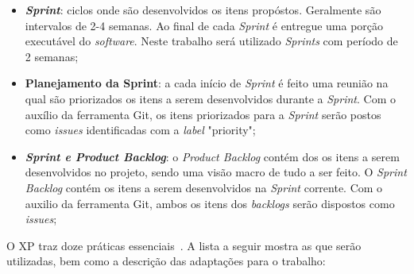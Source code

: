 \begin{itemize}
  \item \textit{\textbf{Sprint}}: ciclos onde são desenvolvidos os itens propóstos. Geralmente
    são intervalos de 2-4 semanas. Ao final de cada \textit{Sprint} é entregue uma porção 
    executável do \textit{software}. Neste trabalho será utilizado \textit{Sprints} com período
    de 2 semanas;
  \item \textbf{Planejamento da Sprint}: a cada início de \textit{Sprint} é feito uma reunião
    na qual são priorizados os itens a serem desenvolvidos durante a \textit{Sprint}.
    Com o auxílio da ferramenta Git, os itens priorizados para a \textit{Sprint} serão
    postos como \textit{issues} identificadas com a \textit{label} "priority";
  \item \textbf{\textit{Sprint e Product Backlog}}: o \textit{Product Backlog} contém dos os itens a serem
    desenvolvidos no projeto, sendo uma visão macro de tudo a ser feito.
    O \textit{Sprint Backlog} contém os itens a serem desenvolvidos na \textit{Sprint} corrente.
  Com o auxilio da ferramenta Git, ambos os itens dos \textit{backlogs} serão dispostos
  como \textit{issues};
\end{itemize}

O XP traz doze práticas essenciais~\cite{gutierrez:2009}. A lista a seguir
mostra as que serão utilizadas, bem como a descrição das adaptações para o trabalho:

